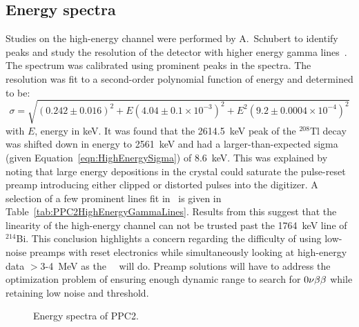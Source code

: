 	    	\subsection{Energy spectra}
		\label{sec:DeploymentPPC2SoudanAnalysisEnergySpectra}    	
			
	Studies on the high-energy channel were performed by A.~Schubert to identify peaks and study the resolution of the detector with higher energy gamma lines~\cite{Schubert:2009ff}.  The spectrum was calibrated using prominent peaks in the spectra.  The resolution was fit to a second-order polynomial function of energy and determined to be:
				\begin{equation}
					\sigma = \sqrt{(0.242 \pm 0.016)^{2} +  E (4.04 \pm 0.1 \times 10^{-3})^{2} + E^{2} (9.2 \pm 0.0004 \times 10^{-4})^{2}} 
				\label{eqn:HighEnergySigma}
				\end{equation}			
with $E$, energy in keV.  It was found that the 2614.5~keV peak of the $^{208}$Tl decay was shifted down in energy to 2561~keV and had a larger-than-expected sigma (given Equation~\ref{eqn:HighEnergySigma}) of 8.6~keV.  This was explained by noting that large energy depositions in the crystal could saturate the pulse-reset preamp introducing either clipped or distorted pulses into the digitizer.  A selection of a few prominent lines fit in~\cite{Schubert:2009ff} is given in Table~\ref{tab:PPC2HighEnergyGammaLines}.  Results from this suggest that the linearity of the high-energy channel can not be trusted past the 1764~keV line of $^{214}$Bi.  This conclusion highlights a concern regarding the difficulty of using low-noise preamps with reset electronics while simultaneously looking at high-energy data $>$3-4~MeV as the \MJ~\minmod~will do.  Preamp solutions will have to address the optimization problem of ensuring enough dynamic range to search for $0 \nu \beta \beta$ while retaining low noise and threshold.  
	
				\begin{figure}
					\centering
					\caption[Energy spectra of PPC2]
					{Energy spectra of PPC2.}
					\label{fig:PPC2EnergySpectra}
				\end{figure}	
	
